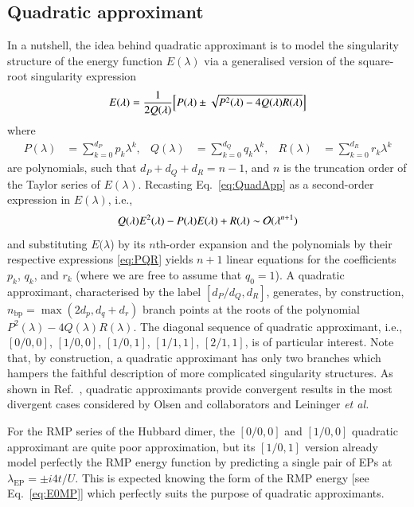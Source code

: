 \documentclass[aps,prb,reprint,noshowkeys,linenumbers,superscriptaddress]{revtex4-1}
\newcommand{\latin}[1]{#1}
\newcommand{\ie}{\latin{i.e.}}
\newcommand{\etal}{\textit{et al.}}
\begin{document}
\subsection{Quadratic approximant}
In a nutshell, the idea behind quadratic approximant is to model the singularity structure of the energy function $E(\lambda)$ via a generalised version of the square-root singularity expression \cite{Mayer_1985,Goodson_2011,Goodson_2019}
\begin{equation}
	\label{eq:QuadApp}
	E(\lambda) = \frac{1}{2 Q(\lambda)} \qty[ P(\lambda) \pm \sqrt{P^2(\lambda) - 4 Q(\lambda) R(\lambda)} ]
\end{equation}
where 
\begin{align}
	\label{eq:PQR}
	P(\lambda) & = \sum_{k=0}^{d_P} p_k \lambda^k,
	&
	Q(\lambda) & = \sum_{k=0}^{d_Q} q_k \lambda^k, 
	&
	R(\lambda) & = \sum_{k=0}^{d_R} r_k \lambda^k 
\end{align}
are polynomials, such that $d_P + d_Q + d_R = n - 1$, and $n$ is the truncation order of the Taylor series of $E(\lambda)$.
Recasting Eq.~\eqref{eq:QuadApp} as a second-order expression in $E(\lambda)$, \ie,
\begin{equation}
	Q(\lambda) E^2(\lambda) - P(\lambda) E(\lambda) + R(\lambda) \sim \order*{\lambda^{n+1}}
\end{equation}
and substituting $E(\lambda$) by its $n$th-order expansion and the polynomials by their respective expressions \eqref{eq:PQR} yields $n+1$ linear equations for the coefficients $p_k$, $q_k$, and $r_k$ (where we are free to assume that $q_0 = 1$).
A quadratic approximant, characterised by the label $[d_P/d_Q,d_R]$, generates, by construction, $n_\text{bp} = \max(2d_p,d_q+d_r)$ branch points at the roots of the polynomial $P^2(\lambda) - 4 Q(\lambda) R(\lambda)$.
The diagonal sequence of quadratic approximant, \ie, $[0/0,0]$, $[1/0,0]$, $[1/0,1]$, $[1/1,1]$, $[2/1,1]$, is of particular interest.
Note that, by construction, a quadratic approximant has only two branches which hampers the faithful description of more complicated singularity structures.
As shown in Ref.~, quadratic approximants provide convergent results in the most divergent cases considered by Olsen and collaborators \cite{Christiansen_1996,Olsen_1996} and Leininger \etal \cite{Leininger_2000}

For the RMP series of the Hubbard dimer, the $[0/0,0]$ and $[1/0,0]$ quadratic approximant are quite poor approximation, but its $[1/0,1]$ version already model perfectly the RMP energy function by predicting a single pair of EPs at $\lambda_\text{EP} = \pm i 4t/U$.
This is expected knowing the form of the RMP energy [see Eq.~\eqref{eq:E0MP}] which perfectly suits the purpose of quadratic approximants.
\end{document}
